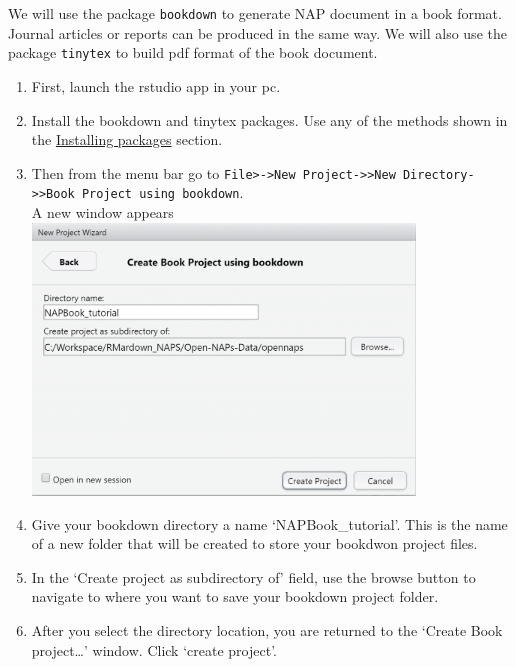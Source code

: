 \documentclass[
]{book}
\begin{document}
We will use the package \texttt{bookdown} to generate NAP document in a book format. Journal articles or reports can be produced in the same way.
We will also use the package \texttt{tinytex} to build pdf format of the book document.

\begin{enumerate}
\def\labelenumi{\arabic{enumi}.}
\item
  First, launch the rstudio app in your pc.
\item
  Install the bookdown and tinytex packages. Use any of the methods shown in the \protect\hyperlink{installing-packages}{Installing packages} section.\\
\item
  Then from the menu bar go to \texttt{File\textgreater{}-\textgreater{}New\ Project-\textgreater{}\textgreater{}New\ Directory-\textgreater{}\textgreater{}Book\ Project\ using\ bookdown}.\\
  A new window appears\\
  \includegraphics[width=4in,height=\textheight]{tutorial_screenshots/open_bkdown_proj.png}
\item
  Give your bookdown directory a name `NAPBook\_tutorial'. This is the name of a new folder that will be created to store your bookdwon project files.\\
\item
  In the `Create project as subdirectory of' field, use the browse button to navigate to where you want to save your bookdown project folder.\\
\item
  After you select the directory location, you are returned to the `Create Book project\ldots{}' window. Click `create project'.\\

\end{enumerate}
\end{document}
